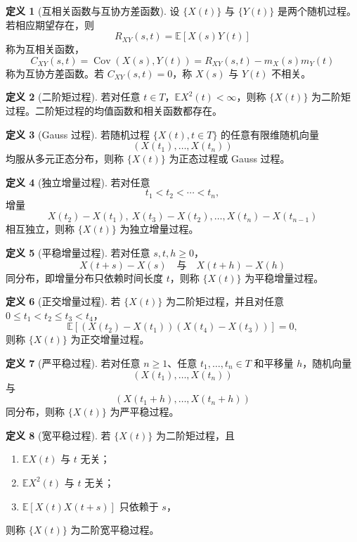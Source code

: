 \documentclass[12pt,a4paper,openany]{ctexrep}
\theoremstyle{definition}
\newtheorem{definition}{定义}[section]
\newcommand{\E}{\mathbb{E}}
\newcommand{\Cov}{\operatorname{Cov}}
\begin{document}
\begin{definition}[互相关函数与互协方差函数]
设 $\{X(t)\}$ 与 $\{Y(t)\}$ 是两个随机过程。若相应期望存在，则
\[
R_{XY}(s,t)=\E[X(s)Y(t)]
\]
称为互相关函数，
\[
C_{XY}(s,t)=\Cov(X(s),Y(t))
=R_{XY}(s,t)-m_X(s)m_Y(t)
\]
称为互协方差函数。若 $C_{XY}(s,t)=0$，称 $X(s)$ 与 $Y(t)$ 不相关。
\end{definition}

\begin{definition}[二阶矩过程]
若对任意 $t\in T$，$\E X^2(t)<\infty$，则称 $\{X(t)\}$ 为二阶矩过程。二阶矩过程的均值函数和相关函数都存在。
\end{definition}

\begin{definition}[Gauss 过程]
若随机过程 $\{X(t),t\in T\}$ 的任意有限维随机向量
\[
(X(t_1),\dots,X(t_n))
\]
均服从多元正态分布，则称 $\{X(t)\}$ 为正态过程或 Gauss 过程。
\end{definition}

\begin{definition}[独立增量过程]
若对任意
\[
t_1<t_2<\cdots<t_n,
\]
增量
\[
X(t_2)-X(t_1),\ X(t_3)-X(t_2),\dots,X(t_n)-X(t_{n-1})
\]
相互独立，则称 $\{X(t)\}$ 为独立增量过程。
\end{definition}

\begin{definition}[平稳增量过程]
若对任意 $s,t,h\ge0$，
\[
X(t+s)-X(s)\quad\text{与}\quad X(t+h)-X(h)
\]
同分布，即增量分布只依赖时间长度 $t$，则称 $\{X(t)\}$ 为平稳增量过程。
\end{definition}

\begin{definition}[正交增量过程]
若 $\{X(t)\}$ 为二阶矩过程，并且对任意 $0\le t_1<t_2\le t_3<t_4$，
\[
\E[(X(t_2)-X(t_1))(X(t_4)-X(t_3))]=0,
\]
则称 $\{X(t)\}$ 为正交增量过程。
\end{definition}

\begin{definition}[严平稳过程]
若对任意 $n\ge1$、任意 $t_1,\dots,t_n\in T$ 和平移量 $h$，随机向量
\[
(X(t_1),\dots,X(t_n))
\]
与
\[
(X(t_1+h),\dots,X(t_n+h))
\]
同分布，则称 $\{X(t)\}$ 为严平稳过程。
\end{definition}

\begin{definition}[宽平稳过程]
若 $\{X(t)\}$ 为二阶矩过程，且
\begin{enumerate}[label=(\arabic*)]
	\item $\E X(t)$ 与 $t$ 无关；
	\item $\E X^2(t)$ 与 $t$ 无关；
	\item $\E[X(t)X(t+s)]$ 只依赖于 $s$，
\end{enumerate}
则称 $\{X(t)\}$ 为二阶宽平稳过程。
\end{definition}
\end{document}
